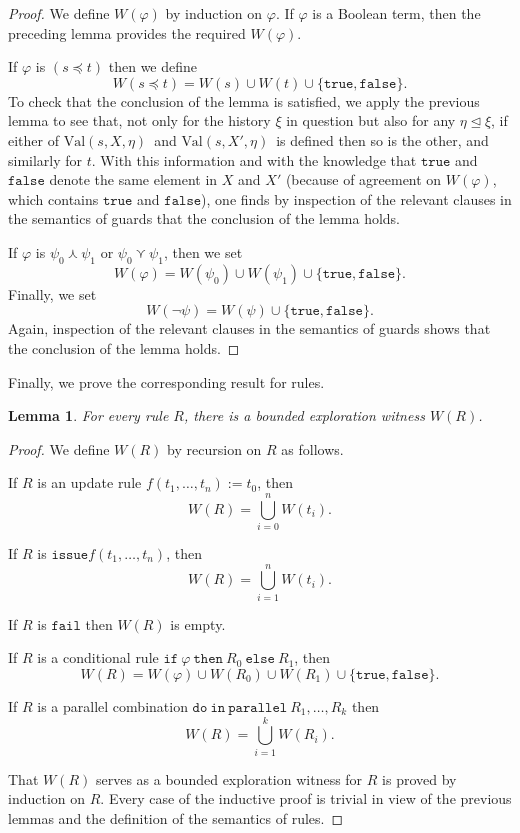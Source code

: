 \documentclass{LMCS}
\newtheorem{la}[thm]{Lemma}
\theoremstyle{definition}
\newcommand{\initeq}{\unlhd}
\newcommand{\kand}{\curlywedge}
\newcommand{\kor}{\curlyvee}
\newcommand{\ttt}[1]{\ensuremath{\mathtt {#1}}}
\newcommand{\val}[3]{\ensuremath{\text{Val}(#1,#2,#3)}}
\renewcommand{\phi}{\varphi}
\begin{document}
\begin{proof}
We define $W(\phi)$ by induction on $\phi$.  If $\phi$ is a Boolean
term, then the preceding lemma provides the required $W(\phi)$.

If $\phi$ is $(s\preceq t)$ then we define
$$
W(s\preceq t)=W(s)\cup W(t)\cup\{\ttt{true,false}\}.
$$
To check that the conclusion of the lemma is satisfied, we apply the
previous lemma to see that, not only for the history $\xi$ in question
but also for any $\eta\initeq\xi$, if either of \val sX\eta\ and \val
s{X'}\eta\ is defined then so is the other, and similarly for $t$.
With this information and
with the knowledge that \ttt{true} and \ttt{false} denote the same
element in $X$ and $X'$ (because of agreement on $W(\phi)$, which
contains \ttt{true} and \ttt{false}), one finds by inspection of the
relevant clauses in the semantics of guards that the conclusion of the
lemma holds.

If $\phi$ is $\psi_0\kand\psi_1$ or $\psi_0\kor\psi_1$, then we set
$$
W(\phi)=W(\psi_0)\cup W(\psi_1)\cup\{\ttt{true,false}\}.
$$
Finally, we set
$$
W(\neg\psi)=W(\psi)\cup\{\ttt{true,false}\}.
$$
Again, inspection of the relevant clauses in the semantics of guards
shows that the conclusion of the lemma holds.
\end{proof}

Finally, we prove the corresponding result for rules.

\begin{la}
For every rule $R$, there is a bounded exploration witness $W(R)$.
\end{la}

\begin{proof}
We define $W(R)$ by recursion on $R$ as follows.

If $R$ is an update rule $f(t_1,\dots,t_n):=t_0$, then
$$
W(R)=\bigcup_{i=0}^nW(t_i).
$$

If $R$ is $\ttt{issue}f(t_1,\dots,t_n)$, then
$$
W(R)=\bigcup_{i=1}^nW(t_i).
$$

If $R$ is \ttt{fail} then $W(R)$ is empty.

If $R$ is a conditional rule $\ttt{if\ }\phi\ttt{\ then\ }R_0\ttt{\
  else\ }R_1$, then
$$
W(R)=W(\phi)\cup W(R_0)\cup W(R_1)\cup\{\ttt{true,false}\}.
$$

If $R$ is a parallel combination $\ttt{do\ in\ parallel\
}R_1,\dots,R_k$ then
$$
W(R)=\bigcup_{i=1}^kW(R_i).
$$

That $W(R)$ serves as a bounded exploration witness for $R$ is proved
by induction on $R$.  Every case of the inductive proof is trivial in
view of the previous lemmas and the definition of the semantics of
rules.
\end{proof}
\end{document}
